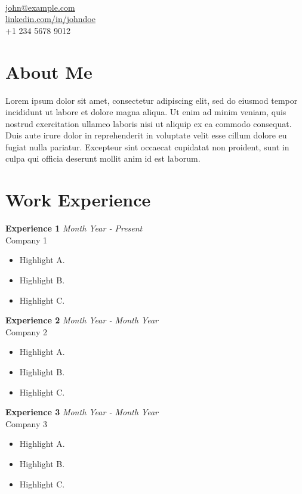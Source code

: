 \documentclass[a4paper,10pt]{article}
\newcommand{\name}[1]{\noindent{\LARGE\bfseries #1}\\}
\newcommand{\sectiontitle}[1]{\section*{#1}}
\begin{document}
\name{John Doe}
\noindent
\href{mailto:john@example.com}{john@example.com} \\
\href{https://linkedin.com/in/johndoe}{linkedin.com/in/johndoe} \\
+1 234 5678 9012 \\
\vspace{1cm}

\sectiontitle{About Me}
\noindent
Lorem ipsum dolor sit amet, consectetur adipiscing elit, sed do eiusmod tempor incididunt ut labore et dolore magna aliqua. Ut enim ad minim veniam, quis nostrud exercitation ullamco laboris nisi ut aliquip ex ea commodo consequat. Duis aute irure dolor in reprehenderit in voluptate velit esse cillum dolore eu fugiat nulla pariatur. Excepteur sint occaecat cupidatat non proident, sunt in culpa qui officia deserunt mollit anim id est laborum.

\vspace{0.5cm}

\sectiontitle{Work Experience}

\noindent
\textbf{Experience 1} \hfill \textit{Month Year - Present}\\
Company 1\\
\begin{itemize}[left=0pt]
    \item Highlight A.
    \item Highlight B.
    \item Highlight C.
\end{itemize}

\vspace{0.3cm}

\noindent
\textbf{Experience 2} \hfill \textit{Month Year - Month Year}\\
Company 2\\
\begin{itemize}[left=0pt]
    \item Highlight A.
    \item Highlight B.
    \item Highlight C.
\end{itemize}

\vspace{0.3cm}

\noindent
\textbf{Experience 3} \hfill \textit{Month Year - Month Year}\\
Company 3\\
\begin{itemize}[left=0pt]
    \item Highlight A.
    \item Highlight B.
    \item Highlight C.
\end{itemize}
\end{document}
